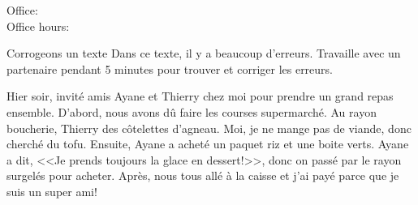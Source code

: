 \documentclass{beamer}
\subtitle[Atelier d'écriture et rédaction) et rayons]{L'atelier d'écriture et la rédaction}
\begin{document}
  \begin{frame}
    \titlepage
    \tiny{Office: \\
          Office hours: }
  \end{frame}

  \begin{frame}{Corrogeons un texte}
    Dans ce texte, il y a beaucoup d'erreurs.
    Travaille avec un partenaire pendant 5 minutes pour trouver et corriger les erreurs. \\
    \begin{block}{}
      Hier soir,
      invité
      amis Ayane et Thierry chez moi pour prendre un grand repas ensemble.
      D'abord, nous avons dû
      faire les courses
      supermarché.
      Au rayon boucherie, Thierry
      des côtelettes d'agneau.
      Moi, je ne mange pas de
      viande, donc
      cherché du tofu.
      Ensuite, Ayane a acheté un paquet
      riz et une boite
      verts.
      Ayane a dit, <<Je prends toujours
      la glace en dessert!>>, donc on
      passé par le rayon surgelés pour
      acheter.
      Après, nous
      tous
        allé
      à la caisse et j'ai payé parce que je suis un super ami!
    \end{block}
  \end{frame}
\end{document}
